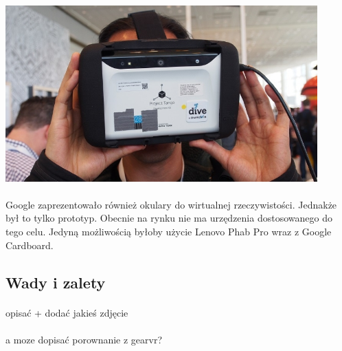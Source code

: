 \begin{center}
\includegraphics[width=0.9\textwidth]{images/tango.jpg}
\end{center}

\paragraph{}
Google zaprezentowało również okulary do wirtualnej rzeczywistości. Jednakże był to tylko prototyp. Obecnie na rynku nie ma urzędzenia dostosowanego do tego celu. Jedyną możliwością byłoby użycie Lenovo Phab Pro wraz z Google Cardboard.

\subsection{Wady i zalety}
\paragraph{}
{\color{red} opisać + dodać jakieś zdjęcie}

\paragraph{}
{\color{red}a moze dopisać porownanie z gearvr?}